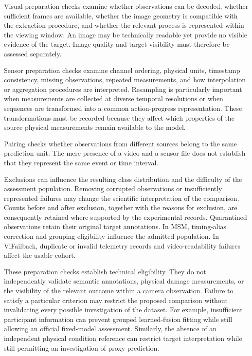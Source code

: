 Visual preparation checks examine whether observations can be decoded, whether sufficient frames are available, whether the image geometry is compatible with the extraction procedure, and whether the relevant process is represented within the viewing window. An image may be technically readable yet provide no visible evidence of the target. Image quality and target visibility must therefore be assessed separately.

Sensor preparation checks examine channel ordering, physical units, timestamp consistency, missing observations, repeated measurements, and how interpolation or aggregation procedures are interpreted. Resampling is particularly important when measurements are collected at diverse temporal resolutions or when sequences are transformed into a common action-progress representation. These transformations must be recorded because they affect which properties of the source physical measurements remain available to the model.

Pairing checks whether observations from different sources belong to the same prediction unit. The mere presence of a video and a sensor file does not establish that they represent the same event or time interval.

Exclusions can influence the resulting class distribution and the difficulty of the assessment population. Removing corrupted observations or insufficiently represented failures may change the scientific interpretation of the comparison. Counts before and after exclusion, together with the reasons for exclusion, are consequently retained where supported by the experimental records. Quarantined observations retain their original target annotations. In MSM, timing-alias correction and grouping eligibility influence the admitted population. In ViFailback, duplicate or invalid telemetry records and video-readability failures affect the usable cohort.

These preparation checks establish technical eligibility. They do not independently validate semantic annotations, physical damage measurements, or the visibility of the relevant outcome within a camera observation. Failure to satisfy a particular criterion may restrict the proposed comparison without invalidating every possible investigation of the dataset. For example, insufficient participant information can prevent grouped learned-fusion fitting while still allowing an official fixed-model assessment. Similarly, the absence of an independent physical condition reference can restrict target interpretation while still permitting an investigation of proxy prediction.


